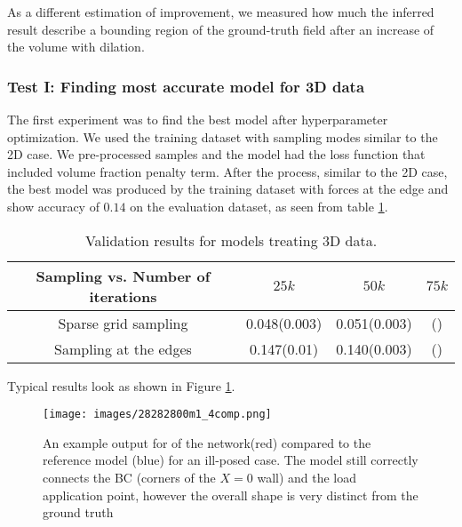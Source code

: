 As a different estimation of improvement, we measured how much the inferred result describe a bounding region of the ground-truth field after an increase of the volume with dilation.

\subsubsection{Test I: Finding most accurate model for 3D data}

The first experiment was to find the best model after hyperparameter optimization.
We used the training dataset with sampling modes similar to the 2D case.
We pre-processed samples and the model had the loss function that included volume fraction penalty term.
After the process, similar to the 2D case, the best model was produced by the training dataset with forces at the edge and show accuracy of $0.14$ on the evaluation dataset, as seen from table \ref{tab:3d_valid}. 

\begin{table}[h]
	\begin{center}
		\begin{tabular}{ |c|c|c|c| }
			\hline
			 Sampling vs. Number of  iterations & $25k$ & $50k$ &  $75k$ \\ 
			\hline
			Sparse grid sampling & 0.048(0.003) & 0.051(0.003) & ()  \\
			Sampling at the edges & 0.147(0.01) & 0.140(0.003) & () \\
			\hline
		\end{tabular}
	\end{center}
	\caption{Validation results for models treating 3D data.}\label{tab:3d_valid}
\end{table}

Typical results look as shown in Figure \ref{fig:3dres_ex}.
\begin{figure}[h]
	\centering
	\texttt{[image: images/28282800m1\_4comp.png]}
	\caption{An example output for of the network(red) compared to the reference model (blue) for an ill-posed case. The model still correctly connects the BC (corners of the $X=0$ wall) and the load application point, however the overall shape is very distinct from the ground truth}
	\label{fig:3dres_ex}
\end{figure}

